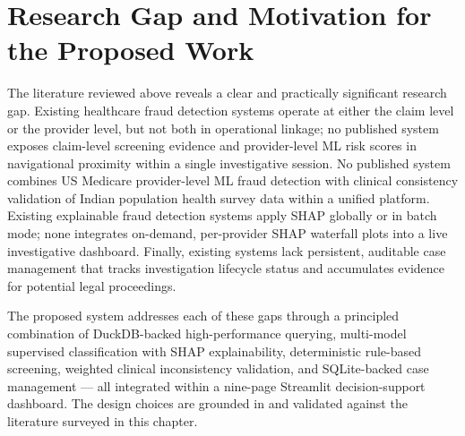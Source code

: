 \section{Research Gap and Motivation for the Proposed Work}
\label{sec:lit-gap}

The literature reviewed above reveals a clear and practically significant research gap. Existing healthcare fraud detection systems operate at either the claim level or the provider level, but not both in operational linkage; no published system exposes claim-level screening evidence and provider-level ML risk scores in navigational proximity within a single investigative session. No published system combines US Medicare provider-level ML fraud detection with clinical consistency validation of Indian population health survey data within a unified platform. Existing explainable fraud detection systems apply SHAP globally or in batch mode; none integrates on-demand, per-provider SHAP waterfall plots into a live investigative dashboard. Finally, existing systems lack persistent, auditable case management that tracks investigation lifecycle status and accumulates evidence for potential legal proceedings.

The proposed system addresses each of these gaps through a principled combination of DuckDB-backed high-performance querying, multi-model supervised classification with SHAP explainability, deterministic rule-based screening, weighted clinical inconsistency validation, and SQLite-backed case management --- all integrated within a nine-page Streamlit decision-support dashboard. The design choices are grounded in and validated against the literature surveyed in this chapter.
